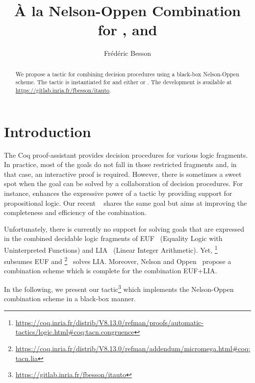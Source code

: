 \documentclass{easychair}
\title{À la Nelson-Oppen Combination for \icoq{congruence}, \icoq{lia} and \icoq{lra}}
\author{ Frédéric Besson}
\institute{Inria, Rennes, France}
\begin{document}
\maketitle

\begin{abstract}
  We propose a tactic for combining decision procedures using a
  black-box Nelson-Oppen scheme.
  The tactic is instantiated for  and either  or .
  The development is available at \url{https://gitlab.inria.fr/fbesson/itauto}.
\end{abstract}


\section{Introduction}
\label{sect:introduction}

The Coq proof-assistant provides decision procedures for various logic
fragments. In practice, most of the goals do not fall in those
restricted fragments and, in that case, an interactive proof is
required.
%
However, there is sometimes a sweet spot when the goal can be solved by a
collaboration of decision procedures.
%
For instance,  enhances the expressive power of a
tactic  by providing support for propositional logic.  Our
recent ~\cite{Itauto} shares the same goal but aims at improving the
completeness and efficiency of the combination.
%

Unfortunately, there is currently no support for solving goals that are
expressed in the combined decidable logic fragments of EUF~\cite{Ackermann} (Equality Logic with
Uninterpreted Functions) and LIA~\cite{presburger} (Linear Integer Arithmetic).
%
Yet, \footnote{\url{https://coq.inria.fr/distrib/V8.13.0/refman/proofs/automatic-tactics/logic.html\#coq:tacn.congruence}}~\cite{Corbineau06} subsumes EUF and \footnote{\url{https://coq.inria.fr/distrib/V8.13.0/refman/addendum/micromega.html\#coq:tacn.lia}}~\cite{BessonCP11,Besson06} solves LIA.
Moreover, Nelson and Oppen~\cite{NelsonO79} propose a combination scheme which is complete for the combination EUF+LIA.

In the following, we present our 
tactic\footnote{\url{https://gitlab.inria.fr/fbesson/itauto}} which implements the Nelson-Oppen combination scheme in a black-box manner.
\end{document}
